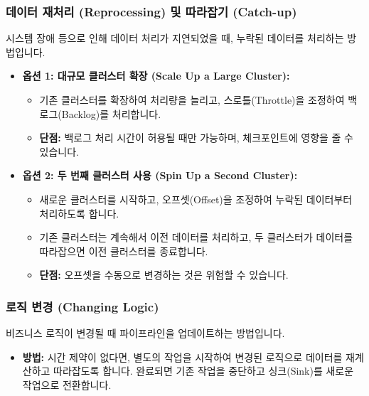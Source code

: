 \documentclass[11pt,a4paper]{article}
\begin{document}
\subsubsection{데이터 재처리 (Reprocessing) 및 따라잡기 (Catch-up)}
시스템 장애 등으로 인해 데이터 처리가 지연되었을 때, 누락된 데이터를 처리하는 방법입니다.
\begin{itemize}
    \item \textbf{옵션 1: 대규모 클러스터 확장 (Scale Up a Large Cluster):}
    \begin{itemize}
        \item 기존 클러스터를 확장하여 처리량을 늘리고, 스로틀(Throttle)을 조정하여 백로그(Backlog)를 처리합니다.
        \item \textbf{단점:} 백로그 처리 시간이 허용될 때만 가능하며, 체크포인트에 영향을 줄 수 있습니다.
    \end{itemize}
    \item \textbf{옵션 2: 두 번째 클러스터 사용 (Spin Up a Second Cluster):}
    \begin{itemize}
        \item 새로운 클러스터를 시작하고, 오프셋(Offset)을 조정하여 누락된 데이터부터 처리하도록 합니다.
        \item 기존 클러스터는 계속해서 이전 데이터를 처리하고, 두 클러스터가 데이터를 따라잡으면 이전 클러스터를 종료합니다.
        \item \textbf{단점:} 오프셋을 수동으로 변경하는 것은 위험할 수 있습니다.
    \end{itemize}
\end{itemize}

\subsubsection{로직 변경 (Changing Logic)}
비즈니스 로직이 변경될 때 파이프라인을 업데이트하는 방법입니다.
\begin{itemize}
    \item \textbf{방법:} 시간 제약이 없다면, 별도의 작업을 시작하여 변경된 로직으로 데이터를 재계산하고 따라잡도록 합니다. 완료되면 기존 작업을 중단하고 싱크(Sink)를 새로운 작업으로 전환합니다.
\end{itemize}
\end{document}
